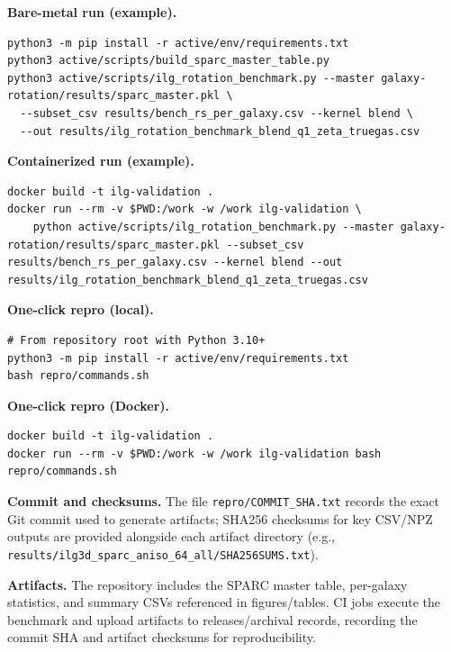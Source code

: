 \documentclass[fleqn,usenatbib]{mnras}
\begin{document}
\noindent\textbf{Bare-metal run (example).}
\begin{verbatim}
python3 -m pip install -r active/env/requirements.txt
python3 active/scripts/build_sparc_master_table.py
python3 active/scripts/ilg_rotation_benchmark.py --master galaxy-rotation/results/sparc_master.pkl \
  --subset_csv results/bench_rs_per_galaxy.csv --kernel blend \
  --out results/ilg_rotation_benchmark_blend_q1_zeta_truegas.csv
\end{verbatim}

\noindent\textbf{Containerized run (example).}
\begin{verbatim}
docker build -t ilg-validation .
docker run --rm -v $PWD:/work -w /work ilg-validation \
    python active/scripts/ilg_rotation_benchmark.py --master galaxy-rotation/results/sparc_master.pkl --subset_csv results/bench_rs_per_galaxy.csv --kernel blend --out results/ilg_rotation_benchmark_blend_q1_zeta_truegas.csv
\end{verbatim}
\noindent\textbf{One-click repro (local).}
\begin{verbatim}
# From repository root with Python 3.10+
python3 -m pip install -r active/env/requirements.txt
bash repro/commands.sh
\end{verbatim}

\noindent\textbf{One-click repro (Docker).}
\begin{verbatim}
docker build -t ilg-validation .
docker run --rm -v $PWD:/work -w /work ilg-validation bash repro/commands.sh
\end{verbatim}

\noindent\textbf{Commit and checksums.} The file \texttt{repro/COMMIT\_SHA.txt} records the exact Git commit used to generate artifacts; SHA256 checksums for key CSV/NPZ outputs are provided alongside each artifact directory (e.g., \texttt{results/ilg3d\_sparc\_aniso\_64\_all/SHA256SUMS.txt}).

\noindent\textbf{Artifacts.} The repository includes the SPARC master table, per-galaxy statistics, and summary CSVs referenced in figures/tables. CI jobs execute the benchmark and upload artifacts to releases/archival records, recording the commit SHA and artifact checksums for reproducibility.
\end{document}
